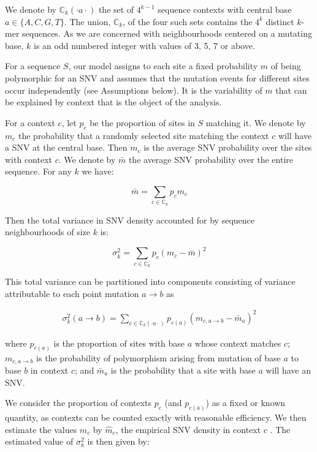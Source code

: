 We denote by $\mathbb{C}_k(\cdot a \cdot)$ the set of $4^{k-1}$ sequence contexts with central base $a \in \{A,C,G,T\}$. The union, $\mathbb{C}_k$, of the four such sets contains the $4^k$ distinct $k$-mer sequences. As we are concerned with neighbourhoods centered on a mutating base, $k$ is an odd numbered integer with values of 3, 5, 7 or above.

For a sequence $S$, our model assigns to each site a fixed probability $m$ of being polymorphic for an SNV and assumes that the mutation events for different sites occur independently (see Assumptions below). It is the variability of $m$ that can be explained by context that is the object of the analysis.

For a context $c$, let $p_c$ be the proportion of sites in $S$ matching it. We denote by $m_c$ the probability that a randomly selected site matching the context $c$ will have a SNV at the central base.  Then $m_c$ is the average SNV probability over the sites with context $c$.  
We denote by $\bar{m}$ the average SNV probability
over the entire sequence. For any $k$ we have:

$$\bar{m} = \sum_{c \in \mathbb{C}_k} p_c m_c$$

\noindent Then the total variance in SNV density accounted for by sequence neighbourhoods of size  $k$ is:

$$\sigma^2_k = \sum_{c \in \mathbb{C}_k} p_c {(m_c - \bar{m})}^2 $$

\noindent This total variance can be partitioned into components consisting of variance attributable to each point mutation $a \rightarrow b$ as

\begin{align} \label{eq:mm1}
\sigma^2_k (a \rightarrow b) = \sum_{c \in \mathbb{C}_k(\cdot a \cdot)} p_{c(a)} {(m_{c,a \rightarrow b} - \bar{m}_a)}^2
\end{align}

\noindent where $p_{c(a)}$ is the proportion of sites with base $a$ whose context matches $c$; $m_{c,a\rightarrow b}$ is the probability of polymorphism arising from mutation of base $a$ to base $b$ in context $c$; and $\bar{m}_a$ is the probability that a site with base $a$ will have an SNV.

We consider the proportion of contexts $p_c$ (and $p_{c(a)}$) as a fixed or known quantity, as contexts can be counted exactly with reasonable efficiency. We then estimate the values $m_c$ by $\hat{m}_c$, the empirical SNV density in context $c$ \citep[cf.][]{aikens2019signals}. The estimated value of $\sigma^2_k$ is then given by:

